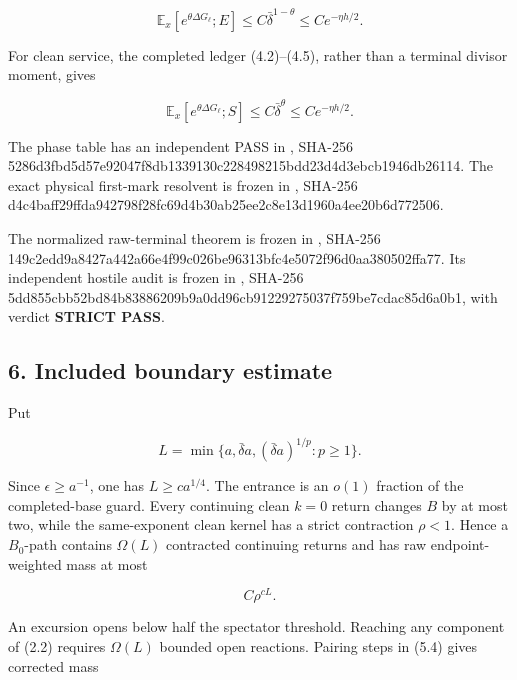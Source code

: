 \[
 \mathbb E_x[e^{\theta\Delta G_\ell};E]
        \le C\bar\delta^{1-\theta}
        \le C e^{-\eta h/2}.                               \tag{5.7}
\]

For clean service, the completed ledger (4.2)--(4.5), rather than a
terminal divisor moment, gives

\[
 \mathbb E_x[e^{\theta\Delta G_\ell};S]
        \le C\bar\delta^\theta
        \le C e^{-\eta h/2}.                               \tag{5.8}
\]

The phase table has an independent PASS in
\texttt{},
SHA-256
5286d3fbd5d57e92047f8db1339130c228498215bdd23d4d3ebcb1946db26114. The
exact physical first-mark resolvent is frozen in
\texttt{}, SHA-256
d4c4baff29ffda942798f28fc69d4b30ab25ee2c8e13d1960a4ee20b6d772506.

The normalized raw-terminal theorem is frozen in
\texttt{},
SHA-256
149c2edd9a8427a442a66e4f99c026be96313bfc4e5072f96d0aa380502ffa77. Its
independent hostile audit is frozen in
\texttt{},
SHA-256
5dd855cbb52bd84b83886209b9a0dd96cb91229275037f759be7cdac85d6a0b1, with
verdict \textbf{STRICT PASS}.

\subsection{6. Included boundary
estimate}

Put

\[
 L=\min\{a,\bar\delta a,
              (\bar\delta a)^{1/p}:p\ge1\}.                 \tag{6.1}
\]

Since \(\epsilon\ge a^{-1}\), one has \(L\ge ca^{1/4}\). The entrance is
an \(o(1)\) fraction of the completed-base guard. Every continuing clean
\(k=0\) return changes \(B\) by at most two, while the same-exponent
clean kernel has a strict contraction \(\rho<1\). Hence a \(B_0\)-path
contains \(\Omega(L)\) contracted continuing returns and has raw
endpoint-weighted mass at most

\[
                              C\rho^{cL}.                   \tag{6.2}
\]

An excursion opens below half the spectator threshold. Reaching any
component of (2.2) requires \(\Omega(L)\) bounded open reactions.
Pairing steps in (5.4) gives corrected mass

